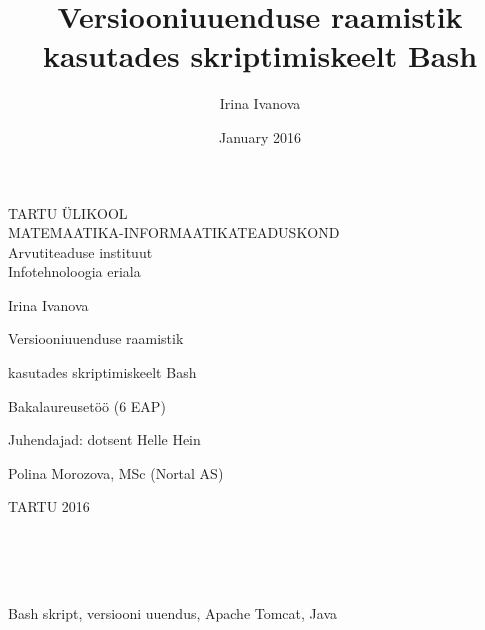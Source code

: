 \documentclass[12pt]{report}
\title{Versiooniuuenduse raamistik kasutades skriptimiskeelt Bash}
\author{Irina Ivanova}
\date{January 2016}
\begin{document}
  \begin{titlepage}
    \begin{center}
      TARTU ÜLIKOOL\\
      MATEMAATIKA-INFORMAATIKATEADUSKOND\\
      Arvutiteaduse instituut\\
      Infotehnoloogia eriala
    \end{center}
      
    \vspace{5cm}
    
    \begin{center}  
      {\Large Irina Ivanova}
    \end{center}
    \begin{center}      
      {\huge Versiooniuuenduse raamistik}
    \end{center}
    \begin{center}
      {\huge kasutades skriptimiskeelt Bash}
    \end{center}
    \begin{center}
      {\large Bakalaureusetöö (6 EAP)}
    \end{center}
      
    \vspace{4cm}
    \hspace{4.5cm}
    Juhendajad: dotsent Helle Hein
    
    \hspace{7cm}
    Polina Morozova, MSc (Nortal AS)
      
    \vspace{2.5cm}
    \begin{center}
      TARTU 2016
    \end{center}
  \end{titlepage}

  \newpage
  
  \\
  
  \\
  \vspace{2cm}
  
  \\
  Bash skript, versiooni uuendus, Apache Tomcat, Java
  \vspace{2cm}

  \\
\end{document}
